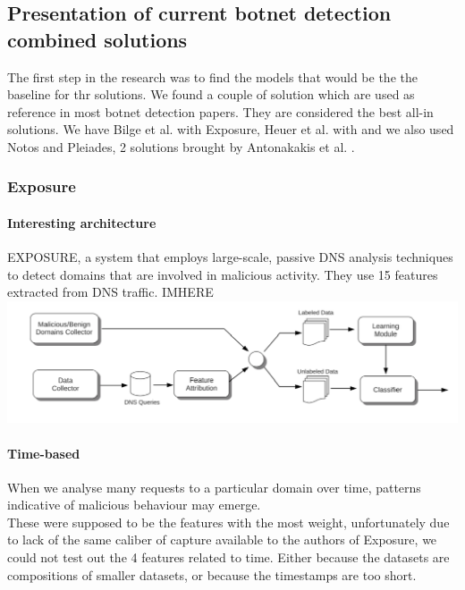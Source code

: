 \subsection{Presentation of current botnet detection combined solutions}
The first step in the research was to find the models that would be the the baseline for thr                        solutions. We found a couple of solution which are used as reference in most botnet detection papers. They are considered the best all-in solutions. We have Bilge et al.\cite{exposure} with Exposure, Heuer et al. with and we also used Notos and Pleiades, 2 solutions brought by Antonakakis et al. \cite{pleiades}.

\subsubsection{Exposure}
\paragraph{Interesting architecture}
EXPOSURE, a system that employs large-scale, passive DNS analysis
techniques to detect domains that are involved in malicious activity.
They use 15 features extracted from DNS traffic.
IMHERE
\includegraphics[scale=.8]{img/exposure_architecture.png}

\paragraph{Time-based}
When we analyse many requests to a particular domain over time, patterns indicative of malicious behaviour may emerge.\\
These were supposed to be the features with the most weight, unfortunately due to lack of the same caliber of capture available to the authors of Exposure, we could not test out the 4 features related to time. Either because the datasets are compositions of smaller datasets, or because the timestamps are too short.
